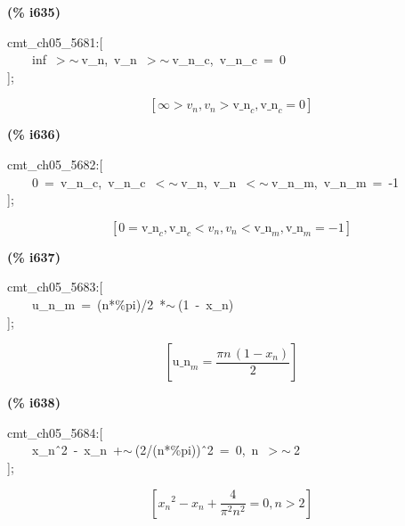 \documentclass[fleqn]{article}
\begin{document}
\noindent
\begin{minipage}[t]{4.000000em}\color{red}\bfseries
(\% i635)	
\end{minipage}
\begin{minipage}[t]{\textwidth}\color{blue}
cmt\_ch05\_5681:[\\
\ \ \ \ inf\ \ensuremath{>}\ensuremath{\sim\ }v\_n,\ v\_n\ \ensuremath{>}\ensuremath{\sim\ }v\_n\_c,\ v\_n\_c\ =\ 0\\
];
\end{minipage}
\[\displaystyle \tag{\% o635} 
\left[ \infty \operatorname{>  }{v_n}\operatorname{,}{v_n}\operatorname{>  }{{\ensuremath{\mathrm{v\_ n}}}_c}\operatorname{,}{{\ensuremath{\mathrm{v\_ n}}}_c}=0\right] \mbox{}
\]


\noindent
\begin{minipage}[t]{4.000000em}\color{red}\bfseries
(\% i636)	
\end{minipage}
\begin{minipage}[t]{\textwidth}\color{blue}
cmt\_ch05\_5682:[\\
\ \ \ \ 0\ =\ v\_n\_c,\ v\_n\_c\ \ensuremath{<}\ensuremath{\sim\ }v\_n,\ v\_n\ \ensuremath{<}\ensuremath{\sim\ }v\_n\_m,\ v\_n\_m\ =\ -1\\
];
\end{minipage}
\[\displaystyle \tag{\% o636} 
\left[ 0={{\ensuremath{\mathrm{v\_ n}}}_c}\operatorname{,}{{\ensuremath{\mathrm{v\_ n}}}_c}\operatorname{<  }{v_n}\operatorname{,}{v_n}\operatorname{<  }{{\ensuremath{\mathrm{v\_ n}}}_m}\operatorname{,}{{\ensuremath{\mathrm{v\_ n}}}_m}=-1\right] \mbox{}
\]


\noindent
\begin{minipage}[t]{4.000000em}\color{red}\bfseries
(\% i637)	
\end{minipage}
\begin{minipage}[t]{\textwidth}\color{blue}
cmt\_ch05\_5683:[\\
\ \ \ \ u\_n\_m\ =\ (n*\%pi)/2\ *\ensuremath{\sim\ }(1\ -\ x\_n)\ \ \ \ \\
];
\end{minipage}
\[\displaystyle \tag{\% o637} 
\left[ {{\ensuremath{\mathrm{u\_ n}}}_m}=\frac{\ensuremath{\pi}  n\, \left( 1-{x_n}\right) }{2}\right] \mbox{}
\]


\noindent
\begin{minipage}[t]{4.000000em}\color{red}\bfseries
(\% i638)	
\end{minipage}
\begin{minipage}[t]{\textwidth}\color{blue}
cmt\_ch05\_5684:[\\
\ \ \ \ x\_n\^\ 2\ -\ x\_n\ +\ensuremath{\sim\ }(2/(n*\%pi))\^\ 2\ =\ 0,\ n\ \ensuremath{>}\ensuremath{\sim\ }2\\
];
\end{minipage}
\[\displaystyle \tag{\% o638} 
\left[ {{{x_n}}^{2}}-{x_n}+\frac{4}{{{\ensuremath{\pi} }^{2}} {{n}^{2}}}=0\operatorname{,}n\operatorname{>  }2\right] \mbox{}
\]
\end{document}
